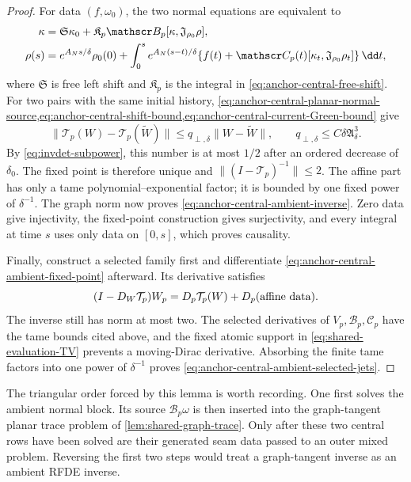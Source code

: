 \begin{proof}
For data \((f,\omega_0)\), the two normal equations are equivalent to
\begin{align}
 \kappa
 &=\mathfrak S\kappa_0
   +\mathfrak K_p\mathscr B_p
        [\kappa,\mathfrak J_{\rho_0}\rho],\notag\\
 \rho(s)
 &=e^{A_Ns/\delta}\rho_0(0)
   +\int_0^s e^{A_N(s-t)/\delta}
       \{f(t)+\mathscr C_p(t)
           [\kappa_t,\mathfrak J_{\rho_0}\rho_t]\}\,\dd t,
                                                        \label{eq:anchor-central-ambient-fixed-point}
\end{align}
where \(\mathfrak S\) is free left shift and \(\mathfrak K_p\) is the
integral in \cref{eq:anchor-central-free-shift}.  For two pairs with the
same initial history,
\cref{eq:anchor-central-planar-normal-source,eq:anchor-central-shift-bound,eq:anchor-central-current-Green-bound}
give
\begin{equation}
 \|\mathcal T_p(W)-\mathcal T_p(\widetilde W)\|
 \le q_{\perp,\delta}\|W-\widetilde W\|,
 \qquad q_{\perp,\delta}\le C\delta\mathfrak A_\delta^3.     \label{eq:anchor-central-ambient-perturbation-number}
\end{equation}
By \cref{eq:invdet-subpower}, this number is at most \(1/2\) after an
ordered decrease of \(\delta_0\).  The fixed point is therefore unique and
\(\|(I-\mathcal T_p)^{-1}\|\le2\).  The affine part has only a tame
polynomial--exponential factor; it is bounded by one fixed power of
\(\delta^{-1}\).  The graph norm now proves
\cref{eq:anchor-central-ambient-inverse}.  Zero data give injectivity, the
fixed-point construction gives surjectivity, and every integral at time
\(s\) uses only data on \([0,s]\), which proves causality.

Finally, construct a selected family first and differentiate
\cref{eq:anchor-central-ambient-fixed-point} afterward.  Its derivative
satisfies
\[
 (I-D_W\mathcal T_p)W_p
 =D_p\mathcal T_p(W)+D_p(\hbox{affine data}).
\]
The inverse still has norm at most two.  The selected derivatives of
\(V_p,\mathscr B_p,\mathscr C_p\) have the tame bounds cited above, and
the fixed atomic support in \cref{eq:shared-evaluation-TV} prevents a
moving-Dirac derivative.  Absorbing the finite tame factors into one power
of \(\delta^{-1}\) proves
\cref{eq:anchor-central-ambient-selected-jets}.
\end{proof}

The triangular order forced by this lemma is worth recording.  One first
solves the ambient normal block.  Its source
\(\mathscr B_p\omega\) is then inserted into the graph-tangent planar trace
problem of \cref{lem:shared-graph-trace}.  Only after these two central
rows have been solved are their generated seam data passed to an outer
mixed problem.  Reversing the first two steps would treat a graph-tangent
inverse as an ambient RFDE inverse.

